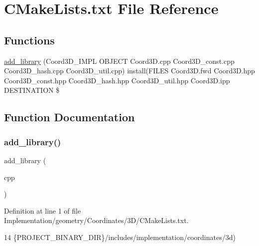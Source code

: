 \hypertarget{Implementation_2geometry_2Coordinates_23D_2CMakeLists_8txt}{}\section{C\+Make\+Lists.\+txt File Reference}
\label{Implementation_2geometry_2Coordinates_23D_2CMakeLists_8txt}
\subsection*{Functions}
\begin{DoxyCompactItemize}
\item 
\hyperlink{Implementation_2geometry_2Coordinates_23D_2CMakeLists_8txt_a0a107170c173254794073215cf189ed7}{add\+\_\+library} (Coord3\+D\+\_\+\+I\+M\+PL O\+B\+J\+E\+CT Coord3\+D.\+cpp Coord3\+D\+\_\+const.\+cpp Coord3\+D\+\_\+hash.\+cpp Coord3\+D\+\_\+util.\+cpp) install(F\+I\+L\+ES Coord3\+D.\+fwd Coord3\+D.\+hpp Coord3\+D\+\_\+const.\+hpp Coord3\+D\+\_\+hash.\+hpp Coord3\+D\+\_\+util.\+hpp Coord3\+D.\+ipp D\+E\+S\+T\+I\+N\+A\+T\+I\+ON \$
\end{DoxyCompactItemize}


\subsection{Function Documentation}
\mbox{\label{Implementation_2geometry_2Coordinates_23D_2CMakeLists_8txt_a0a107170c173254794073215cf189ed7}} 
\subsubsection{\texorpdfstring{add\+\_\+library()}{add\_library()}}
{\footnotesize\ttfamily add\+\_\+library (\begin{DoxyParamCaption}\item[{Coord3\+D\+\_\+\+I\+M\+PL O\+B\+J\+E\+CT Coord3\+D.\+cpp Coord3\+D\+\_\+const.\+cpp Coord3\+D\+\_\+hash.\+cpp Coord3\+D\+\_\+util.}]{cpp }\end{DoxyParamCaption})}



Definition at line 1 of file Implementation/geometry/\+Coordinates/3\+D/\+C\+Make\+Lists.\+txt.


\begin{DoxyCode}
14                \{PROJECT\_BINARY\_DIR\}/includes/implementation/coordinates/3d)
\end{DoxyCode}
